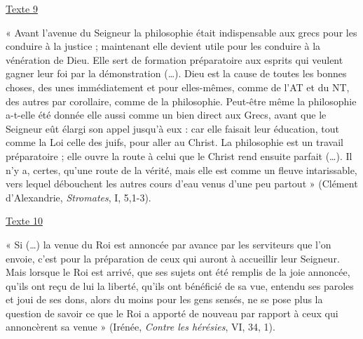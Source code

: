 \underline{Texte 9}

« Avant l'avenue du Seigneur la philosophie était indispensable aux
grecs pour les conduire à la justice ; maintenant elle devient utile
pour les conduire à la vénération de Dieu. Elle sert de formation
préparatoire aux esprits qui veulent gagner leur foi par la
démonstration (\ldots). Dieu est la cause de toutes les bonnes choses,
des unes immédiatement et pour elles-mêmes, comme de l'AT et du NT, des
autres par corollaire, comme de la philosophie. Peut-être même la
philosophie a-t-elle été donnée elle aussi comme un bien direct aux
Grecs, avant que le Seigneur eût élargi son appel jusqu'à eux : car elle
faisait leur éducation, tout comme la Loi celle des juifs, pour aller au
Christ. La philosophie est un travail préparatoire ; elle ouvre la route
à celui que le Christ rend ensuite parfait (\ldots). Il n'y a, certes,
qu'une route de la vérité, mais elle est comme un fleuve intarissable,
vers lequel débouchent les autres cours d'eau venus d'une peu partout »
(Clément d'Alexandrie, \emph{Stromates}, I, 5,1-3).

\underline{Texte 10}

« Si (\ldots) la venue du Roi est annoncée par avance par les serviteurs
que l'on envoie, c'est pour la préparation de ceux qui auront à
accueillir leur Seigneur. Mais lorsque le Roi est arrivé, que ses sujets
ont été remplis de la joie annoncée, qu'ils ont reçu de lui la liberté,
qu'ils ont bénéficié de sa vue, entendu ses paroles et joui de ses dons,
alors du moins pour les gens sensés, ne se pose plus la question de
savoir ce que le Roi a apporté de nouveau par rapport à ceux qui
annoncèrent sa venue » (Irénée, \emph{Contre les hérésies}, VI, 34, 1).
